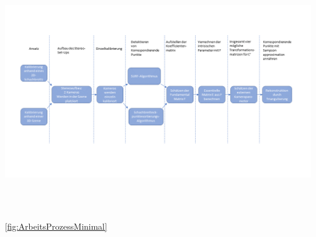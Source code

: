 	\begin{minipage}{\linewidth}
	\centering
	\includegraphics[width=1.\linewidth]{images/ArbeitsProzessReal.png}
	\label{fig:ArbeitsProzessReal}
\end{minipage}\\ \\


\ref{fig:ArbeitsProzessMinimal}